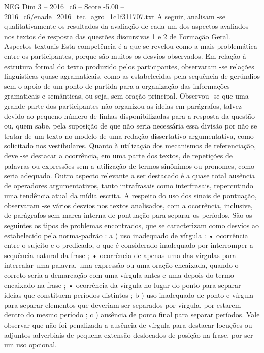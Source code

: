 \begin{textsample}{NEG Dim 3 – 2016\_c6 – Score -5.00 – 2016\_c6/enade\_2016\_tec\_agro\_1c1f311707.txt}
A seguir, analisam -se qualitativamente os resultados da avaliação de cada um dos aspectos avaliados nos textos de resposta das questões discursivas 1 e 2 de Formação Geral.
Aspectos textuais Esta competência é a que se revelou como a mais problemática entre os participantes, porque são muitos os desvios observados.
Em relação à estrutura formal do texto produzido pelos participantes, observaram -se relações linguísticas quase agramaticais, como as estabelecidas pela sequência de gerúndios sem o apoio de um ponto de partida para a organização das informações gramaticais e semânticas, ou seja, sem oração principal.
Observou -se que uma grande parte dos participantes não organizou as ideias em parágrafos, talvez devido ao pequeno número de linhas disponibilizadas para a resposta da questão ou, quem sabe, pela suposição de que não seria necessária essa divisão por não se tratar de um texto no modelo de uma redação dissertativo-argumentativa, como solicitado nos vestibulares.
Quanto à utilização dos mecanismos de referenciação, deve -se destacar a ocorrência, em uma parte dos textos, de repetições de palavras ou expressões sem a utilização de termos sinônimos ou pronomes, como seria adequado.
Outro aspecto relevante a ser destacado é a quase total ausência de operadores argumentativos, tanto intrafrasais como interfrasais, repercutindo uma tendência atual da mídia escrita.
A respeito do uso dos sinais de pontuação, observaram -se vários desvios nos textos analisados, com a ocorrência, inclusive, de parágrafos sem marca interna de pontuação para separar os períodos.
São os seguintes os tipos de problemas encontrados, que se caracterizam como desvios ao estabelecido pela norma-padrão : a ) uso inadequado de vírgula : • ocorrência entre o sujeito e o predicado, o que é considerado inadequado por interromper a sequência natural da frase ; • ocorrência de apenas uma das vírgulas para intercalar uma palavra, uma expressão ou uma oração encaixada, quando o correto seria a demarcação com uma vírgula antes e uma depois do termo encaixado na frase ; • ocorrência da vírgula no lugar do ponto para separar ideias que constituem períodos distintos ; b ) uso inadequado de ponto e vírgula para separar elementos que deveriam ser separados por vírgula, por estarem dentro do mesmo período ; c ) ausência de ponto final para separar períodos.
Vale observar que não foi penalizada a ausência de vírgula para destacar locuções ou adjuntos adverbiais de pequena extensão deslocados de posição na frase, por ser um uso opcional.

\end{textsample}
